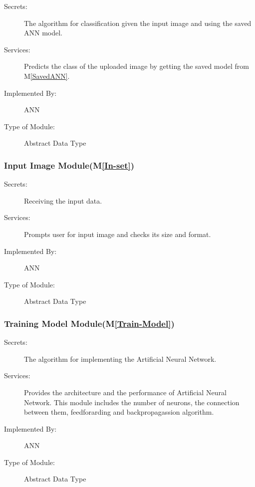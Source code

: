 \documentclass[12pt, titlepage]{article}
\newcommand{\mref}[1]{M\ref{#1}}
\begin{document}
\begin{description}
  \item[Secrets:]The algorithm for classification given the input image and using the 
  saved ANN model.
  \item[Services:]Predicts the class of the uploaded image by getting the saved model from \mref{SavedANN}.
  \item[Implemented By:] ANN
  \item[Type of Module:] Abstract Data Type
\end{description}


\subsubsection{Input Image Module(\mref{In-set})}

\begin{description}
  \item[Secrets:]Receiving the input data.
  \item[Services:]Prompts user for input image and checks its size and format.
  \item[Implemented By:] ANN
  \item[Type of Module:] Abstract Data Type
\end{description}

\subsubsection{Training Model Module(\mref{Train-Model})}

\begin{description}
  \item[Secrets:]The algorithm for implementing the Artificial Neural Network.
  \item[Services:]Provides the architecture and the performance of Artificial Neural Network. 
  This module includes the number of neurons, the connection between them, feedforarding and backpropagassion 
  algorithm.
  \item[Implemented By:] ANN
  \item[Type of Module:] Abstract Data Type
\end{description}


\end{document}
